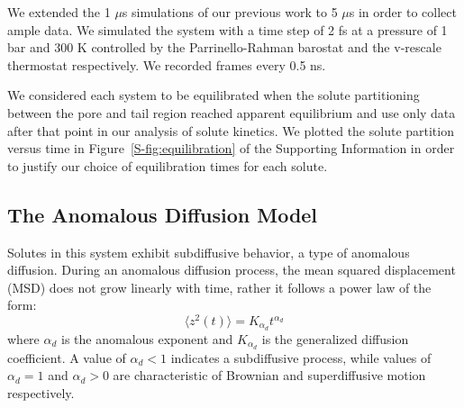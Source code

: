 \documentclass{article}
\begin{document}
  We extended the 1 $\mu$s simulations of our previous work to 5 $\mu$s in order
  to collect ample data. We simulated the system with a time step of 2 fs at a pressure
  of 1 bar and 300 K controlled by the Parrinello-Rahman barostat and the v-rescale 
  thermostat respectively. We recorded frames every 0.5 ns.
  
  We considered each system to be equilibrated when the solute partitioning between the 
  pore and tail region reached apparent equilibrium and use only data after that point
  in our analysis of solute kinetics. We plotted the solute partition versus time in
  Figure~\ref{S-fig:equilibration} of the Supporting Information in order to justify 
  our choice of equilibration times for each solute.

  \subsection{The Anomalous Diffusion Model}\label{method:model_sFBM}

  Solutes in this system exhibit subdiffusive behavior, a type of anomalous diffusion.
  During an anomalous diffusion process, the mean squared displacement (MSD)
  does not grow linearly with time, rather it follows a power law of the form:
  \begin{equation} 
  \langle z^2(t) \rangle = K_{\alpha_d}t^{\alpha_d}
  \label{eqn:msd_form}
  \end{equation} 
  where $\alpha_d$ is the anomalous exponent and $K_{\alpha_d}$ is the generalized 
  diffusion coefficient. A value of $\alpha_d < 1$ indicates a subdiffusive process, 
  while values of $\alpha_d = 1$ and $\alpha_d > 0$ are characteristic of Brownian and
  superdiffusive motion respectively.
  
\end{document}
